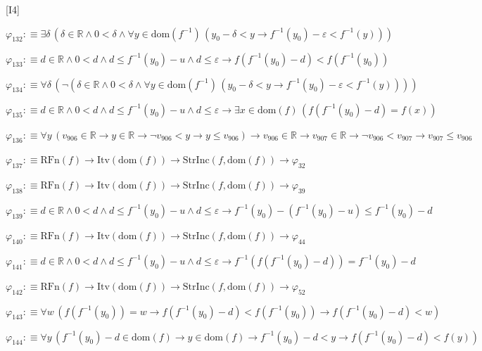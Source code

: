 \begin{fullproof}{[I4]}
\begin{abbrevlist}
\item $\varphi_{132} :\equiv \exists \delta\,(\delta \in \mathbb{R} \land 0 < \delta \land \forall y \in \mathrm{dom}(f^{-1})\,(y_{0} - \delta < y \to f^{-1}(y_{0}) - \varepsilon < f^{-1}(y)))$
\item $\varphi_{133} :\equiv d \in \mathbb{R} \land 0 < d \land d \leq f^{-1}(y_{0}) - u \land d \leq \varepsilon \to f(f^{-1}(y_{0}) - d) < f(f^{-1}(y_{0}))$
\item $\varphi_{134} :\equiv \forall \delta\,(\neg (\delta \in \mathbb{R} \land 0 < \delta \land \forall y \in \mathrm{dom}(f^{-1})\,(y_{0} - \delta < y \to f^{-1}(y_{0}) - \varepsilon < f^{-1}(y))))$
\item $\varphi_{135} :\equiv d \in \mathbb{R} \land 0 < d \land d \leq f^{-1}(y_{0}) - u \land d \leq \varepsilon \to \exists x \in \mathrm{dom}(f)\,(f(f^{-1}(y_{0}) - d) = f(x))$
\item $\varphi_{136} :\equiv \forall y\,(v_{906} \in \mathbb{R} \to y \in \mathbb{R} \to \neg v_{906} < y \to y \leq v_{906}) \to v_{906} \in \mathbb{R} \to v_{907} \in \mathbb{R} \to \neg v_{906} < v_{907} \to v_{907} \leq v_{906}$
\item $\varphi_{137} :\equiv \mathrm{RFn}(f) \to \mathrm{Itv}(\mathrm{dom}(f)) \to \mathrm{StrInc}(f,\mathrm{dom}(f)) \to \varphi_{32}$
\item $\varphi_{138} :\equiv \mathrm{RFn}(f) \to \mathrm{Itv}(\mathrm{dom}(f)) \to \mathrm{StrInc}(f,\mathrm{dom}(f)) \to \varphi_{39}$
\item $\varphi_{139} :\equiv d \in \mathbb{R} \land 0 < d \land d \leq f^{-1}(y_{0}) - u \land d \leq \varepsilon \to f^{-1}(y_{0}) - (f^{-1}(y_{0}) - u) \leq f^{-1}(y_{0}) - d$
\item $\varphi_{140} :\equiv \mathrm{RFn}(f) \to \mathrm{Itv}(\mathrm{dom}(f)) \to \mathrm{StrInc}(f,\mathrm{dom}(f)) \to \varphi_{44}$
\item $\varphi_{141} :\equiv d \in \mathbb{R} \land 0 < d \land d \leq f^{-1}(y_{0}) - u \land d \leq \varepsilon \to f^{-1}(f(f^{-1}(y_{0}) - d)) = f^{-1}(y_{0}) - d$
\item $\varphi_{142} :\equiv \mathrm{RFn}(f) \to \mathrm{Itv}(\mathrm{dom}(f)) \to \mathrm{StrInc}(f,\mathrm{dom}(f)) \to \varphi_{52}$
\item $\varphi_{143} :\equiv \forall w\,(f(f^{-1}(y_{0})) = w \to f(f^{-1}(y_{0}) - d) < f(f^{-1}(y_{0})) \to f(f^{-1}(y_{0}) - d) < w)$
\item $\varphi_{144} :\equiv \forall y\,(f^{-1}(y_{0}) - d \in \mathrm{dom}(f) \to y \in \mathrm{dom}(f) \to f^{-1}(y_{0}) - d < y \to f(f^{-1}(y_{0}) - d) < f(y))$

\end{abbrevlist}
\end{fullproof}
